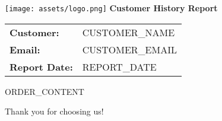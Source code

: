 \documentclass[12pt]{article}
\begin{document}
\begin{center}
    \texttt{[image: assets/logo.png]} %
    \vspace{0.5cm}
    \Huge\textbf{Customer History Report}
\end{center}

\vspace{0.5cm}

\begin{tabular}{ll}
    \textbf{Customer:} & CUSTOMER_NAME \\
    \textbf{Email:} & CUSTOMER_EMAIL \\
    \textbf{Report Date:} & REPORT_DATE \\
\end{tabular}

\vspace{1cm}

ORDER_CONTENT

\vspace{1cm}

\begin{center}
    Thank you for choosing us!
\end{center}

\end{document}
